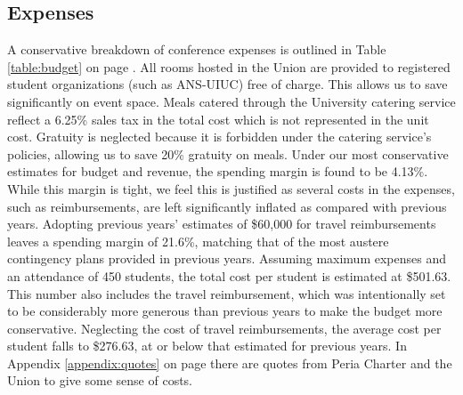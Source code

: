 \subsection{Expenses}
A conservative breakdown of conference expenses is outlined in Table \ref{table:budget} on page \pageref{table:budget}. All rooms hosted in the Union are provided to registered student organizations (such as ANS-UIUC) free of charge. This allows us to save significantly on event space. Meals catered through the University catering service reflect a 6.25\% sales tax in the total cost which is not represented in the unit cost. Gratuity is neglected because it is forbidden under the catering service’s policies, allowing us to save 20\% gratuity on meals. 
Under our most conservative estimates for budget and revenue, the spending margin is found to be 4.13\%. While this margin is tight, we feel this is justified as several costs in the expenses, such as reimbursements, are left significantly inflated as compared with previous years. Adopting previous years’ estimates of \$60,000 for travel reimbursements leaves a spending margin of 21.6\%, matching that of the most austere contingency plans provided in previous years. 
Assuming maximum expenses and an attendance of 450 students, the total cost per student is estimated at \$501.63. This number also includes the travel reimbursement, which was intentionally set to be considerably more generous than previous years to make the budget more conservative. Neglecting the cost of travel reimbursements, the average cost per student falls to \$276.63, at or below that estimated for previous years. In Appendix \ref{appendix:quotes} on page \pageref{appendix:quotes} there are quotes from Peria Charter and the Union to give some sense of costs.


